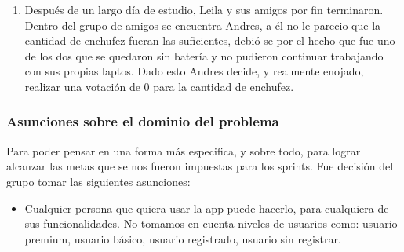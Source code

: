 \begin{enumerate}
\item Después de un largo día de estudio, Leila y sus amigos por fin terminaron. Dentro del grupo de amigos se encuentra Andres, a él no le parecio que la cantidad de enchufez fueran las suficientes, debió se por el hecho que fue uno de los dos que se quedaron sin batería y no pudieron continuar trabajando con sus propias laptos. Dado esto Andres decide, y realmente enojado, realizar una votación de 0 para la cantidad de enchufez.  

\end{enumerate}


\subsubsection{Asunciones sobre el dominio del problema}

Para poder pensar en una forma más especifica, y sobre todo, para lograr alcanzar las metas que se nos fueron impuestas para los sprints. Fue decisión del grupo tomar las siguientes asunciones:

\begin{itemize}
\item Cualquier persona que quiera usar la app puede hacerlo, para cualquiera de sus funcionalidades. No tomamos en cuenta niveles de usuarios como: usuario premium, usuario básico, usuario registrado, usuario sin registrar.
\end{itemize}
